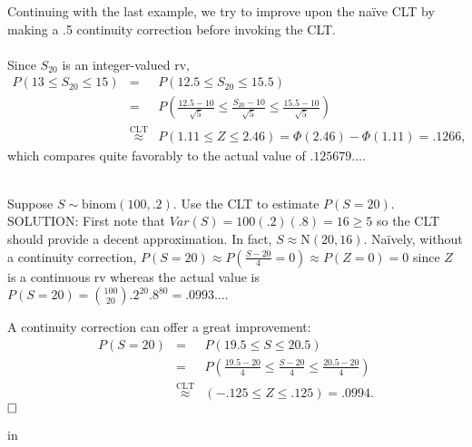\documentclass[12pt]{article}
\begin{document}
\bigskip



\noindent Continuing with the last example, we try to improve upon the na\"{i}ve CLT by making a .5 continuity correction before invoking the CLT.\\

\\
\noindent Since $S_{20}$ is an integer-valued rv,
\begin{eqnarray*}
P(13\le S_{20}\le 15) & = & P(12.5\le S_{20}\le 15.5)\\
& = & P\left( \frac {12.5-10}{\sqrt{5}} \le \frac {S_{20}-10}{\sqrt{5}} \le \frac {15.5-10}{\sqrt{5}}\right)\\
& \stackrel{\text{CLT}}{\approx} & P(1.11 \le Z\le 2.46) = \Phi(2.46)-\Phi(1.11) = .1266,
\end{eqnarray*}
which compares quite favorably to the actual value of $.125679\dots$.




\newpage






\\
Suppose $S\sim \mbox{binom}(100,.2)$.  Use the CLT to estimate $P(S=20)$.\\

\noindent SOLUTION:  First note that $Var(S)= 100(.2)(.8)=16 \ge 5$ so the CLT should provide a decent approximation. In fact, $S\approx \mbox{N}(20,16)$.
Na\"ively, without a continuity correction, $P(S=20)\approx P(\frac {S-20}{4}=0)\approx P(Z=0)=0$ since $Z$ is a continuous rv whereas the actual
value is $P(S=20) = {100\choose 20}.2^{20}.8^{80}= .0993\dots$.

A continuity correction can offer a great improvement:
\begin{eqnarray*}
P(S=20) &=& P(19.5\le S\le 20.5) \\&=& P(\frac {19.5-20}{4}\le \frac {S-20}{4} \le \frac {20.5-20}{4}) \\
&\stackrel{\text{CLT}}{\approx}&(-.125\le Z\le .125) = .0994.
\end{eqnarray*}$\hfill\Box$


 in
\end{document}
